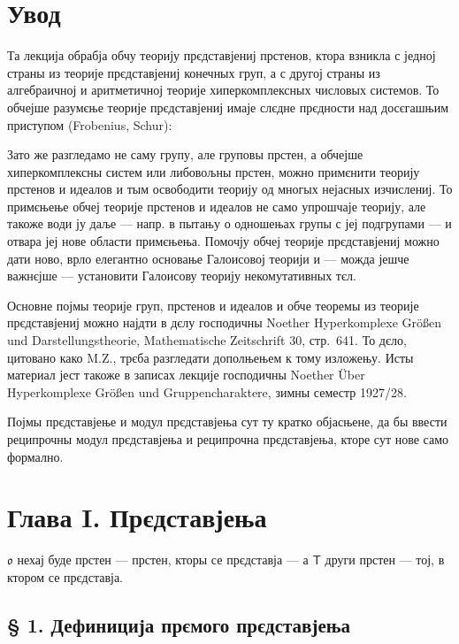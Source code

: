 \documentclass[11pt]{article}
\newcommand{\foreign}[1]{#1}
\begin{document}
\clearpage
\section*{Увод}\label{einleitung}

Та лекција обрабја обчу теорију прєдставјениј прстенов, ктора взникла с
једној страны из теорије прєдставјениј конечных груп, а с другој страны
из алгебраичној и аритметичној теорије хиперкомплексных числовых
системов. То обчејше разумєње теорије прєдставјениј имаје слєдне
прєдности над досєгашњим приступом (\foreign{Frobenius},
\foreign{Schur}):

Зато же разгледамо не саму групу, але груповы прстен, а обчејше
хиперкомплексны систем или либовољны прстен, можно примєнити
теорију прстенов и идеалов и тым освободити теорију од многых нејасных
изчислениј. То примєњење обчеј теорије прстенов и идеалов не само
упрошчаје теорију, але такоже води ју даље --- напр. в пытању о
одношењах групы с јеј подгрупами --- и отвара јеј нове области
примєњења. Помочју обчеј теорије прєдставјениј можно дати ново, врло
елегантно основање Галоисовој теорији и --- можда јешче важнєјше ---
установити Галоисову теорију некомутативных тєл.

Основне појмы теорије груп, прстенов и идеалов и обче теоремы из теорије
прєдставјениј можно најдти в дєлу господичны \foreign{Noether}
\foreign{Hyperkomplexe Größen und Darstellungstheorie},
\foreign{Mathematische Zeitschrift} 30, стр.~641. То дєло, цитовано
како \foreign{M.Z.}, трєба разгледати дополњењем к тому изложењу.
Исты материал јест такоже в записах лекције господичны
\foreign{Noether} \foreign{Über Hyperkomplexe Größen und
Gruppencharaktere}, зимны семестр 1927/28.

Појмы прєдставјење и модул прєдставјења сут ту кратко објасњене,
да бы ввести реципрочны модул прєдставјења и реципрочна
прєдставјења, кторе сут нове само формално.

\section*{Глава I. Прєдставјења}\label{kapitel-i.-darstellungen}

$\mathfrak{o}$ нехај буде прстен --- прстен, кторы се прєдставја --- а
$\mathsf T$ други прстен --- тој, в ктором се прєдставја.

\subsection*{§ 1. Дефиниција прємого прєдставјења}\label{definition-der-direkten-darstellung}
\end{document}
